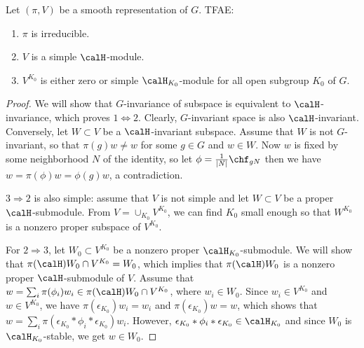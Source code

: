 \begin{proposition}
\label{simple}
Let $(\pi, V)$ be a smooth representation of $G$. TFAE:
\begin{enumerate}
\item $\pi$ is irreducible. 
\item $V$ is a simple $\calH$-module. 
\item $V^{K_{0}}$ is either zero or simple $\calH_{K_{0}}$-module for all open subgroup $K_{0}$ of $G$. 
\end{enumerate}
\end{proposition}
\begin{proof}
We will show that $G$-invariance of subspace is equivalent to $\calH$-invariance, which proves $1\Leftrightarrow 2$. Clearly,  $G$-invariant space is also $\calH$-invariant. Conversely, let $W\subset V$ be a $\calH$-invariant subspace. Assume that $W$ is not $G$-invariant, so that $\pi(g)w\neq w$ for some $g\in G$ and $w\in W$. 
Now $w$ is fixed by some neighborhood $N$ of the identity, so let $\phi = \frac{1}{|N|} \chf_{gN}$ then we have $w = \pi(\phi)w = \phi(g)w$, a contradiction. 

$3\Rightarrow 2$ is also simple: assume that $V$ is not simple and let $W \subset V$ be a proper $\calH$-submodule. From $V = \cup_{K_{0}} V^{K_{0}}$, we can find $K_{0}$ small enough so that $W^{K_{0}}$ is a nonzero proper subspace of $V^{K_{0}}$.

For $2\Rightarrow3$, let $W_{0}\subset V^{K_{0}}$ be a nonzero proper $\calH_{K_{0}}$-submodule. We will show that $\pi(\calH)W_{0} \cap V^{K_{0}} = W_{0}$, which implies that $\pi(\calH)W_{0}$ is a nonzero proper $\calH$-submodule of $V$. 
Assume that $w = \sum_{i} \pi(\phi_{i})w_{i} \in \pi(\calH)W_{0}\cap V^{K_{0}}$, where $w_{i}\in W_{0}$. 
Since $w_{i}\in V^{K_{0}}$ and $w\in V^{K_{0}}$, we have $\pi(\epsilon_{K_{0}})w_{i} = w_{i}$ and $\pi(\epsilon_{K_{0}})w = w$, which shows that $w = \sum_{i} \pi(\epsilon_{K_{0}} * \phi_{i} * \epsilon_{K_{0}}) w_{i}$. 
However, $\epsilon_{K_{0}} * \phi_{i} * \epsilon_{K_{0}} \in \calH_{K_{0}}$ and since $W_{0}$ is $\calH_{K_{0}}$-stable, we get $w\in W_{0}$. 
\end{proof}

